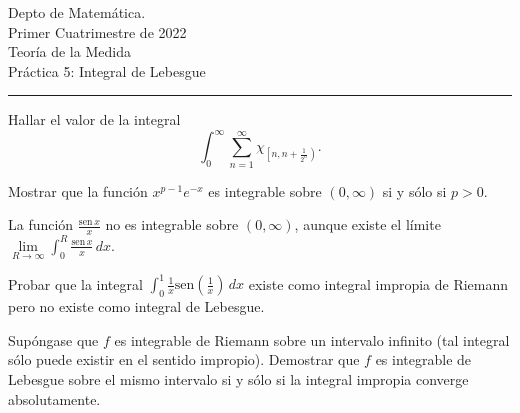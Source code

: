 \documentclass{book}
\begin{document}


\begin{large}
\begin{bfseries} %
        \noindent Depto de Matem\'atica.\\
        Primer Cuatrimestre de 2022\\                                                                                                                                                                                                                                                                                                                                                
        Teoría de la Medida \\
        Práctica 5: Integral de Lebesgue

\end{bfseries}
\end{large}
\par\noindent\rule{\textwidth}{.5pt}


\begin{ejer}{}  Hallar el valor de la integral
\[
 \int_0^\infty \sum_{n=1}^\infty \chi_{\left[n,n+\frac{1}{2^n}\right)}.
\]

 
\end{ejer}






\begin{ejer}{}
  Mostrar que la función $x^{p-1} e^{-x}$ es integrable sobre $(0,\infty)$ si y sólo si $p>0$.
	\end{ejer}
  
	\begin{ejer}{}
  La función $\frac{\text{sen}\,x}{x}$ no es integrable sobre $(0,\infty)$, aunque existe el límite
\linebreak  $\lim\limits_{R\rightarrow \infty}\int_0^R \frac{\text{sen}\,x}{x}\,dx.$
\end{ejer}
	
	\begin{ejer}{}
	Probar que la integral $\int_0^1 \frac{1}{x}\text{sen} \left(\frac{1}{x}\right)\,dx$ 
	existe como integral impropia de Riemann pero no existe como integral de Lebesgue.
	\end{ejer}

	\begin{ejer}{}
	Sup\'ongase que $f$ es integrable de Riemann sobre un intervalo  infinito (tal integral
	s\'olo puede existir en el sentido impropio). 
	Demostrar que $f$ es integrable de Lebesgue sobre el mismo intervalo si y s\'olo si la integral
	impropia converge absolutamente.
  \end{ejer}
	
\end{document}

